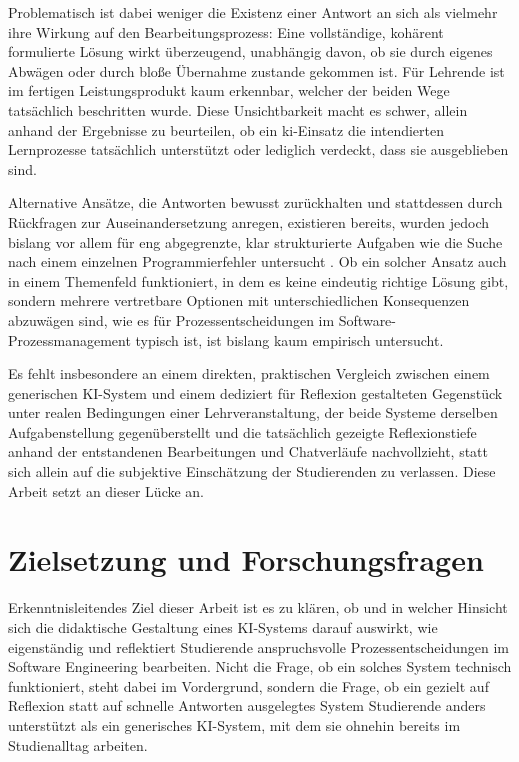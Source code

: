 Problematisch ist dabei weniger die Existenz einer Antwort an sich als vielmehr ihre Wirkung auf den
Bearbeitungsprozess: Eine vollständige, kohärent formulierte Lösung wirkt überzeugend, unabhängig
davon, ob sie durch eigenes Abwägen oder durch bloße Übernahme zustande gekommen ist. Für Lehrende ist
im fertigen Leistungsprodukt kaum erkennbar, welcher der beiden Wege tatsächlich beschritten wurde.
Diese Unsichtbarkeit macht es schwer, allein anhand der Ergebnisse zu beurteilen, ob ein
\acrshort{ki}-Einsatz die intendierten Lernprozesse tatsächlich unterstützt oder lediglich verdeckt,
dass sie ausgeblieben sind.

Alternative Ansätze, die Antworten bewusst zurückhalten und stattdessen durch Rückfragen zur
Auseinandersetzung anregen, existieren bereits, wurden jedoch bislang vor allem für eng abgegrenzte,
klar strukturierte Aufgaben wie die Suche nach einem einzelnen Programmierfehler untersucht
\cite{karguptaInstructNotAssist2024}. Ob ein solcher Ansatz auch in einem Themenfeld funktioniert, in
dem es keine eindeutig richtige Lösung gibt, sondern mehrere vertretbare Optionen mit unterschiedlichen
Konsequenzen abzuwägen sind, wie es für Prozessentscheidungen im Software-Prozessmanagement typisch
ist, ist bislang kaum empirisch untersucht.

Es fehlt insbesondere an einem direkten, praktischen Vergleich zwischen einem generischen
KI-System und einem dediziert für Reflexion gestalteten Gegenstück unter realen Bedingungen einer
Lehrveranstaltung, der beide Systeme derselben Aufgabenstellung gegenüberstellt und die tatsächlich
gezeigte Reflexionstiefe anhand der entstandenen Bearbeitungen und Chatverläufe nachvollzieht, statt
sich allein auf die subjektive Einschätzung der Studierenden zu verlassen. Diese Arbeit setzt an dieser
Lücke an.

\section{Zielsetzung und Forschungsfragen}
\label{sec:zielsetzung}
\label{sec:forschungsfrage}

Erkenntnisleitendes Ziel dieser Arbeit ist es zu klären, ob und in welcher Hinsicht sich die
didaktische Gestaltung eines KI-Systems darauf auswirkt, wie eigenständig und reflektiert Studierende
anspruchsvolle Prozessentscheidungen im Software Engineering bearbeiten. Nicht die Frage, ob ein
solches System technisch funktioniert, steht dabei im Vordergrund, sondern die Frage, ob ein gezielt
auf Reflexion statt auf schnelle Antworten ausgelegtes System Studierende anders unterstützt als ein
generisches KI-System, mit dem sie ohnehin bereits im Studienalltag arbeiten.

